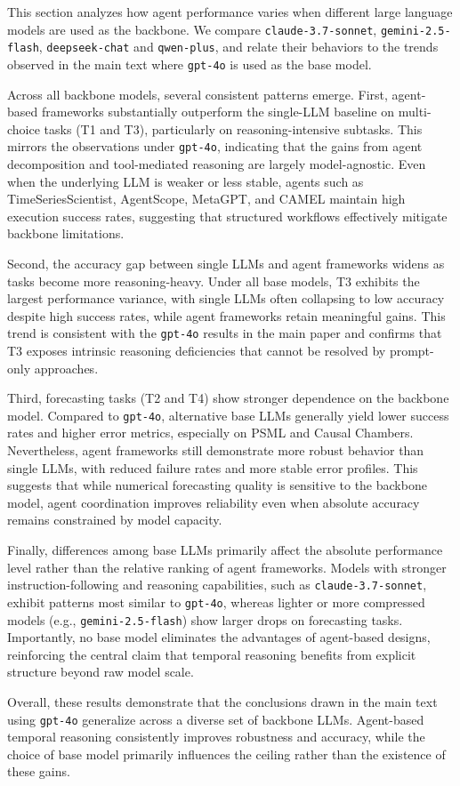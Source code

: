 This section analyzes how agent performance varies when different large language models are used as the backbone. We compare \texttt{claude-3.7\allowbreak-sonnet}, \texttt{gemini-2.5\allowbreak-flash}, \texttt{deepseek\allowbreak-chat} and \texttt{qwen\allowbreak-plus}, and relate their behaviors to the trends observed in the main text where \texttt{gpt-4o} is used as the base model.

Across all backbone models, several consistent patterns emerge. First, agent-based frameworks substantially outperform the single-LLM baseline on multi-choice tasks (T1 and T3), particularly on reasoning-intensive subtasks. This mirrors the observations under \texttt{gpt-4o}, indicating that the gains from agent decomposition and tool-mediated reasoning are largely model-agnostic. Even when the underlying LLM is weaker or less stable, agents such as TimeSeriesScientist, AgentScope, MetaGPT, and CAMEL maintain high execution success rates, suggesting that structured workflows effectively mitigate backbone limitations.

Second, the accuracy gap between single LLMs and agent frameworks widens as tasks become more reasoning-heavy. Under all base models, T3 exhibits the largest performance variance, with single LLMs often collapsing to low accuracy despite high success rates, while agent frameworks retain meaningful gains. This trend is consistent with the \texttt{gpt-4o} results in the main paper and confirms that T3 exposes intrinsic reasoning deficiencies that cannot be resolved by prompt-only approaches.

Third, forecasting tasks (T2 and T4) show stronger dependence on the backbone model. Compared to \texttt{gpt-4o}, alternative base LLMs generally yield lower success rates and higher error metrics, especially on PSML and Causal Chambers. Nevertheless, agent frameworks still demonstrate more robust behavior than single LLMs, with reduced failure rates and more stable error profiles. This suggests that while numerical forecasting quality is sensitive to the backbone model, agent coordination improves reliability even when absolute accuracy remains constrained by model capacity.

Finally, differences among base LLMs primarily affect the absolute performance level rather than the relative ranking of agent frameworks. Models with stronger instruction-following and reasoning capabilities, such as \texttt{claude-3.7-sonnet}, exhibit patterns most similar to \texttt{gpt-4o}, whereas lighter or more compressed models (e.g., \texttt{gemini-2.5-flash}) show larger drops on forecasting tasks. Importantly, no base model eliminates the advantages of agent-based designs, reinforcing the central claim that temporal reasoning benefits from explicit structure beyond raw model scale.

Overall, these results demonstrate that the conclusions drawn in the main text using \texttt{gpt-4o} generalize across a diverse set of backbone LLMs. Agent-based temporal reasoning consistently improves robustness and accuracy, while the choice of base model primarily influences the ceiling rather than the existence of these gains.




